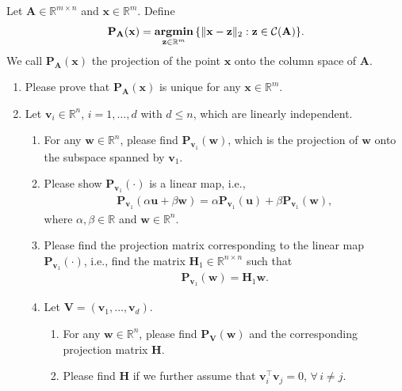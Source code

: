 \documentclass[11pt,letter,notitlepage]{article}
\newcommand{\proj}[2]{\textbf{P}_{#2} (#1)}
\DeclareMathOperator*{\argmin}{\bf argmin}
\begin{document}
\begin{exercise}
	Let $\mathbf{A}\in\mathbb{R}^{m\times n}$ and $\mathbf{x} \in \mathbb{R}^m$. Define
	\begin{align*}
	    \proj{\mathbf{x}}{\mathbf{A}} = \argmin_{\mathbf{z}\in\mathbb{R}^m}\,\{\|\mathbf{x}-\mathbf{z}\|_2: \mathbf{z}\in\mathcal{C}(\mathbf{A})\}.   
	\end{align*}
    We call $\proj{\mathbf{x}}{\mathbf{A}}$ the projection of the point $\mathbf{x}$ onto the column space of $\mathbf{A}$. 
    \begin{enumerate}
        \item Please prove that $\mathbf{P}_{\mathbf{A}}(\mathbf{x})$ is unique for any $\mathbf{x} \in \mathbb{R}^m$. 
        \item Let $\mathbf{v}_i \in \mathbb{R}^n$, $i=1,\ldots,d$ with $d\leq n$, which are linearly independent.
            \begin{enumerate}
		        \item For any $\mathbf{w}\in \mathbb{R}^n$, please find $\proj{\mathbf{w}}{\mathbf{v}_1}$, which is the projection of $\mathbf{w}$ onto the subspace spanned by $\mathbf{v}_1$.  
		        \item Please show $\proj{\cdot}{\mathbf{v}_1}$ is a linear map, i.e.,
		            \begin{align*}
		                \proj{\alpha\mathbf{u}+\beta\mathbf{w}}{\mathbf{v}_1}=\alpha\proj{\mathbf{u}}{\mathbf{v}_1} + \beta \proj{\mathbf{w}}{\mathbf{v}_1},
		            \end{align*}
		            where $\alpha,\beta\in\mathbb{R}$ and $\mathbf{w}\in\mathbb{R}^n$.
		        \item Please find the projection matrix corresponding to the linear map $\proj{\cdot}{\mathbf{v}_1}$, i.e., find the matrix $\mathbf{H}_1\in\mathbb{R}^{n\times n}$ such that
		            \begin{align*}
		                 \proj{\mathbf{w}}{\mathbf{v}_1}=\mathbf{H}_1\mathbf{w}.
		            \end{align*}
		        \item Let $\mathbf{V}=(\mathbf{v}_1,\ldots,\mathbf{v}_d)$. 
		            \begin{enumerate}
		                \item For any $\mathbf{w}\in \mathbb{R}^n$, please find $\proj{\mathbf{w}}{\mathbf{V}}$ and the corresponding projection matrix $\mathbf{H}$.
		                \item Please find $\mathbf{H}$ if we further assume that $\mathbf{v}_i^{\top}\mathbf{v}_j=0$, $\forall\,i\neq j$.
		            \end{enumerate}
	        \end{enumerate}
	        

\end{enumerate}
\end{exercise}
\end{document}
